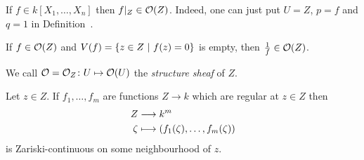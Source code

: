 \documentclass[a4paper,parskip=half,numbers=enddot, DIV=12]{scrreprt}
\begin{document}
	\begin{example}
		\begin{alphanumerate}
			\item If $f\in k[X_1,\ldots,X_n]$ then $f|_Z\in \mathcal{O}(Z)$. Indeed, one can just put $U=Z$, $p=f$ and $q=1$ in Definition~.
			\item If $f\in \mathcal{O}(Z)$ and $V(f) = \left\{z\in Z\ \middle|\  f(z) = 0\right\}$ is empty, then $\frac{1}{f}\in \mathcal{O}(Z)$.
			\item We call $\mathcal{O}=\mathcal{O}_Z\colon U\mapsto \mathcal{O}(U)$ the \emph{structure sheaf} of $Z$.
		\end{alphanumerate}
		
	\end{example}
	
	\begin{prop} 
		Let $z\in Z$. If $f_1,\ldots,f_m$ are functions $Z\to k$ which are regular at $z\in Z$ then
		\begin{align*}
		Z&\longrightarrow k^m\\
		\zeta &\longmapsto (f_1(\zeta),\ldots, f_m(\zeta))
		\end{align*}
		is Zariski-continuous on some neighbourhood of $z$.
	\end{prop}
\end{document}
